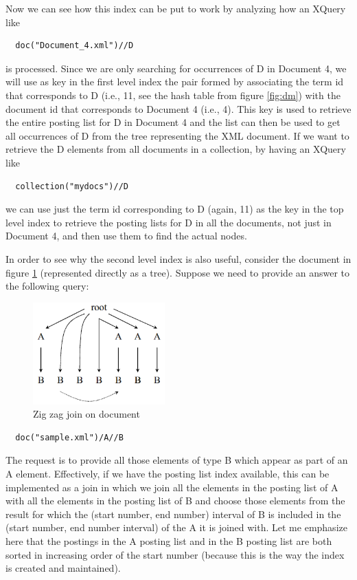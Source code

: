 \documentclass[a4paper,10pt]{article}
\begin{document}
Now we can see how this index can be put to work by analyzing how an XQuery like

\begin{verbatim}
  doc("Document_4.xml")//D
\end{verbatim}

is processed. Since we are only searching for occurrences of D in Document 4, we will
use as key in the first level index the pair formed by associating the term id that corresponds
to D (i.e., 11, see the hash table from figure \ref{fig:dm}) with the document id that
corresponds to Document 4 (i.e., 4). This key is used to retrieve the entire posting list
for D in Document 4 and the list can then be used to get all occurrences of D from the
tree representing the XML document. If we want to retrieve the D elements from all
documents in a collection, by having an XQuery like

\begin{verbatim}
  collection("mydocs")//D
\end{verbatim}

we can use just the term id corresponding to D (again, 11) as the key in the top level index
to retrieve the posting lists for D in all the documents, not just in Document 4, and then
use them to find the actual nodes.

In order to see why the second level index is also useful, consider the document in figure
\ref{fig:zz} (represented directly as a tree). Suppose we need to provide an answer to the
following query:

\begin{figure}[ht]
\begin{center}
\includegraphics[width=2in]{img/zigzag.png}
\end{center}
\caption{Zig zag join on document}
\label{fig:zz}
\end{figure}

\begin{verbatim}
  doc("sample.xml")/A//B
\end{verbatim}

The request is to provide all those elements of type B which appear as part of an A element.
Effectively, if we have the posting list index available, this can be implemented as a join in
which we join all the elements in the posting list of A with all the elements in the posting list
of B and choose those elements from the result for which the (start number, end number)
interval of B is included in the (start number, end number interval) of the A it is joined with.
Let me emphasize here that the postings in the A posting list and in the B posting list are both
sorted in increasing order of the start number (because this is the way the index is created
and maintained).
\end{document}
